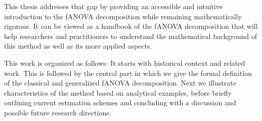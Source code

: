 This thesis addresses that gap by providing an accessible and intuitive introduction to the fANOVA decomposition while remaining mathematically rigorous.
It can be viewed as a handbook of the fANOVA decomposition that will help researchers and practitioners to understand the mathematical background of this method as well as its more applied aspects.\par

This work is organized as follows: It starts with historical context and related work. This is followed by the central part in which we give the formal definition of the classical and generalized fANOVA decomposition.
Next we illustrate characteristics of the method based on analytical examples, before briefly outlining current estimation schemes and concluding with a discussion and possible future research directions.

